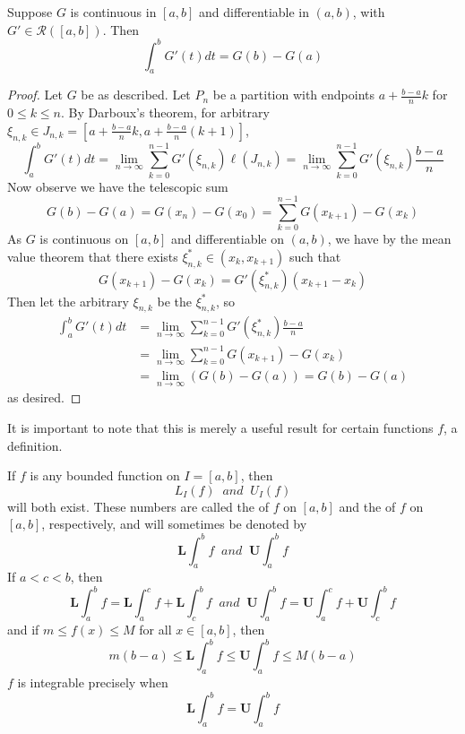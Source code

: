 \begin{namthm}\label{thm:FTC2}
    Suppose $G$ is continuous in $[a,b]$ and differentiable in $(a,b)$, with $G' \in \mathcal{R}([a,b])$. Then $$\int_a^bG'(t)dt = G(b)-G(a)$$
\end{namthm}
\begin{proof}
    Let $G$ be as described. Let $P_n$ be a partition with endpoints $a + \frac{b-a}{n}k$ for $0 \leq k \leq n$. By Darboux's theorem, for arbitrary $\xi_{n,k} \in J_{n,k} = \left[a+\frac{b-a}{n}k,a+\frac{b-a}{n}(k+1)\right]$, \begin{equation*}
        \int_a^bG'(t)dt = \lim\limits_{n\rightarrow \infty}\sum_{k=0}^{n-1}G'(\xi_{n,k})\ell(J_{n,k}) = \lim\limits_{n\rightarrow \infty}\sum_{k=0}^{n-1}G'(\xi_{n,k})\frac{b-a}{n}
    \end{equation*}
    Now observe we have the telescopic sum $$G(b) - G(a) = G(x_n) - G(x_0) = \sum_{k=0}^{n-1}G(x_{k+1})-G(x_k)$$ As $G$ is continuous on $[a,b]$ and differentiable on $(a,b)$, we have by the mean value theorem that there exists $\xi^*_{n,k} \in (x_k,x_{k+1})$ such that $$G(x_{k+1})-G(x_k) = G'(\xi^*_{n,k})(x_{k+1}-x_k)$$ Then let the arbitrary $\xi_{n,k}$ be the $\xi^*_{n,k}$, so \begin{align*}
        \int_a^bG'(t)dt &= \lim\limits_{n\rightarrow \infty}\sum_{k=0}^{n-1}G'(\xi^*_{n,k})\frac{b-a}{n} \\
        &= \lim\limits_{n\rightarrow \infty}\sum_{k=0}^{n-1}G(x_{k+1})-G(x_k) \\
        &= \lim\limits_{n\rightarrow \infty}(G(b) - G(a)) = G(b) - G(a)
    \end{align*}
    as desired.
\end{proof}


It is important to note that this is merely a useful result for certain functions $f$,  a definition.




If $f$ is any bounded function on $I=[a,b]$, then \begin{equation}
    L_I(f)\;\;and\;\;U_I(f)
\end{equation}
will both exist. These numbers are called the  of $f$ on $[a,b]$ and the  of $f$ on $[a,b]$, respectively, and will sometimes be denoted by \begin{equation}
    \mathbf{L}\int_a^bf\;\;and\;\;\mathbf{U}\int_a^bf
\end{equation}
If $a < c < b$, then \begin{equation}
    \mathbf{L}\int_a^bf = \mathbf{L}\int_a^cf + \mathbf{L}\int_c^bf\;\;and\;\;\mathbf{U}\int_a^bf = \mathbf{U}\int_a^cf + \mathbf{U}\int_c^bf
\end{equation}
and if $m \leq f(x) \leq M$ for all $x \in [a,b]$, then \begin{equation}
    m(b-a)\leq \mathbf{L}\int_a^bf \leq \mathbf{U}\int_a^bf\leq M(b-a)
\end{equation}
$f$ is integrable precisely when \begin{equation}
    \mathbf{L}\int_a^bf = \mathbf{U}\int_a^bf
\end{equation}


